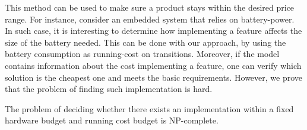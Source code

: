 This method can be used to make sure a product stays within the desired price range. For instance, consider an embedded system that relies on battery-power. In such case, it is interesting to determine how implementing a feature affects the size of the battery needed. This can be done with our approach, by using the battery consumption as running-cost on transitions. Moreover, if the model contains information about the cost implementing a feature, one can verify which solution is the cheapest one and meets the basic requirements. However, we prove that the problem of finding such implementation is hard.

\begin{result}
    The problem of deciding whether there exists an implementation within a fixed hardware budget and running cost budget is NP-complete.
\end{result}



